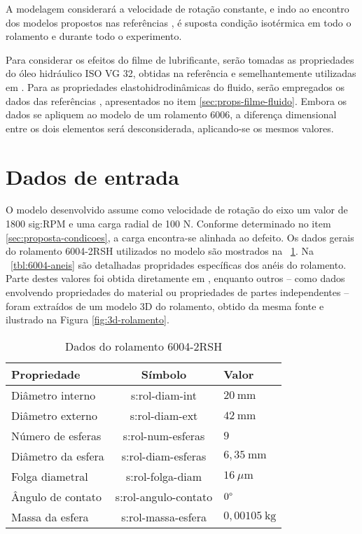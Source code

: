 \documentclass[12pt,oneside,english,brazil,lmodern,siglas,simbolos,cite=num]{ucsmonograph}
\begin{document}
	A modelagem considerará a velocidade de rotação constante, e indo ao encontro dos modelos propostos nas referências \cite{mcfadden:1984,sassi:2007,patil:2010,cong:2013,tandon:1997}, é suposta condição isotérmica em todo o rolamento e durante todo o experimento.
	
	Para considerar os efeitos do filme de lubrificante, serão tomadas as propriedades do óleo hidráulico ISO VG 32, obtidas na referência \cite{iso-vg32} e semelhantemente utilizadas em \cite{nonato:2014}.
	Para as propriedades elastohidrodinâmicas do fluido, serão empregados os dados das referências \cite{roelands:1966,nonato:2014}, apresentados no item \ref{sec:props-filme-fluido}.
	Embora os dados se apliquem ao modelo de um rolamento 6006, a diferença dimensional entre os dois elementos será desconsiderada, aplicando-se os mesmos valores.
	
	\section{Dados de entrada} \label{sec:dados-entrada}
	O modelo desenvolvido assume como velocidade de rotação do eixo um valor de 1800 \gls{sig:RPM} e uma carga radial de 100 N.
	Conforme determinado no item \ref{sec:proposta-condicoes}, a carga encontra-se alinhada ao defeito.
	Os dados gerais do rolamento 6004-2RSH utilizados no modelo são mostrados na \tablename\ \ref{tbl:6004-gerais}.
	Na \tablename\ \ref{tbl:6004-aneis} são detalhadas propridades específicas dos anéis do rolamento.
	Parte destes valores foi obtida diretamente em \cite{skf6004}, enquanto outros -- como dados envolvendo propriedades do material ou propriedades de partes independentes -- foram extraídos de um modelo 3D do rolamento, obtido da mesma fonte e ilustrado na Figura \ref{fig:3d-rolamento}.
	
	\begin{table}[t]
	\caption{Dados do rolamento 6004-2RSH}
	\def\arraystretch{1.2}
	\centering
	\begin{tabular}{l|c|l}
	\toprule
	\textbf{Propriedade} & \textbf{Símbolo} & \textbf{Valor} \\\midrule
	Diâmetro interno & \gls{s:rol-diam-int} & $20\ \text{mm}$ \\
	Diâmetro externo & \gls{s:rol-diam-ext} & $42\ \text{mm}$ \\
	Número de esferas & \gls{s:rol-num-esferas} & $ 9 $\\
	Diâmetro da esfera & \gls{s:rol-diam-esferas} & $6,35\ \text{mm}$ \\
	Folga diametral & \gls{s:rol-folga-diam} & $ 16\ \mu\text{m} $ \\
	Ângulo de contato & \gls{s:rol-angulo-contato} & $ 0\text\textdegree$\\
	Massa da esfera & \gls{s:rol-massa-esfera} & $ 0,00105\ \text{kg} $
	\\\bottomrule
	\end{tabular}
	\label{tbl:6004-gerais}
	\end{table}
\end{document}
